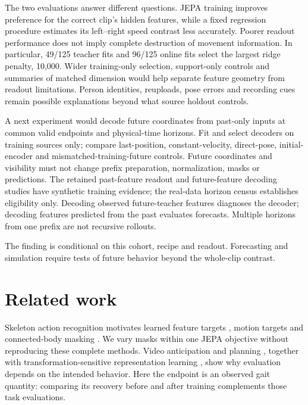 \documentclass{article}
\begin{document}
The two evaluations answer different questions. JEPA training improves
preference for the correct clip's hidden features, while a fixed
regression procedure estimates its left--right speed contrast less
accurately. Poorer readout performance does not imply complete
destruction of movement information. In particular, 49/125 teacher fits
and 96/125 online fits select the largest ridge penalty, 10,000. Wider
training-only selection, support-only controls and summaries of matched
dimension would help separate feature geometry from readout limitations.
Person identities, reuploads, pose errors and recording cues remain
possible explanations beyond what source holdout controls.

A next experiment would decode future coordinates from past-only inputs
at common valid endpoints and physical-time horizons. Fit and select
decoders on training sources only; compare last-position,
constant-velocity, direct-pose, initial-encoder and
mismatched-training-future controls. Future coordinates and visibility
must not change prefix preparation, normalization, masks or predictions.
The retained past-feature readout and future-feature decoding studies
have synthetic training evidence; the real-data horizon census
establishes eligibility only. Decoding observed future-teacher features
diagnoses the decoder; decoding features predicted from the past
evaluates forecasts. Multiple horizons from one prefix are not recursive
rollouts.

The finding is conditional on this cohort, recipe and readout.
Forecasting and simulation require tests of future behavior beyond the
whole-clip contrast.

\section{Related work}\label{related-work}

Skeleton action recognition motivates learned feature targets
\citep{sjepa}, motion targets \citep{mamp} and connected-body masking
\citep{slim}. We vary masks within one JEPA objective without
reproducing these complete methods. Video anticipation and planning
\citep{vjepa2}, together with transformation-sensitive representation
learning \citep{seqjepa}, show why evaluation depends on the intended
behavior. Here the endpoint is an observed gait quantity: comparing its
recovery before and after training complements those task evaluations.

\clearpage


\clearpage
\appendix
\end{document}
